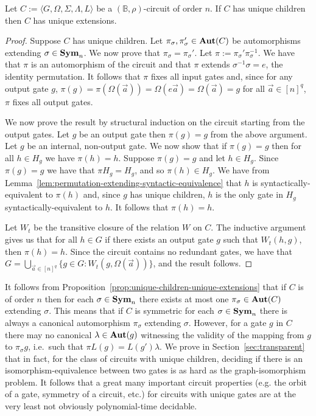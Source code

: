 \documentclass[../paper.tex]{subfiles}
\begin{document}
\begin{prop}
  Let $C := \langle G, \Omega, \Sigma, \Lambda, L\rangle$ be a $(\mathbb{B},
  \rho)$-circuit of order $n$. If $C$ has unique children then $C$ has unique
  extensions.
  \label{prop:unique-children-unique-extensions}
\end{prop}
\begin{proof}
  Suppose $C$ has unique children. Let $\pi_{\sigma}, \pi_{\sigma}' \in \text{\textbf{Aut}}(C)$
  be automorphisms extending $\sigma \in \text{\textbf{Sym}}_n$. We now prove that $\pi_\sigma
  = \pi_{\sigma}'$. Let $\pi := \pi_{\sigma}'\pi^{-1}_\sigma$. We have that
  $\pi$ is an automorphism of the circuit and that $\pi$ extends
  $\sigma^{-1}\sigma = e$, the identity permutation. It follows that $\pi$ fixes
  all input gates and, since for any output gate $g$, $\pi (g) = \pi
  (\Omega(\vec{a})) = \Omega(e \vec{a}) = \Omega(\vec{a}) = g$ for all $\vec{a}
  \in [n]^q$, $\pi$ fixes all output gates.

  We now prove the result by structural induction on the circuit starting from
  the output gates. Let $g$ be an output gate then $\pi (g) = g$ from the above
  argument. Let $g$ be an internal, non-output gate. We now show that if $\pi
  (g) = g$ then for all $h \in H_g$ we have $\pi (h) = h$. Suppose $\pi (g) = g$
  and let $h \in H_g$. Since $\pi (g) = g$ we have that $\pi H_{g} = H_g$, and
  so $\pi (h) \in H_g$. We have from
  Lemma~\ref{lem:permutation-extending-syntactic-equivalence} that $h$ is
  syntactically-equivalent to $\pi (h)$ and, since $g$ has unique children, $h$
  is the only gate in $H_g$ syntactically-equivalent to $h$. It follows that
  $\pi (h) = h$.
  
  Let $W_t$ be the transitive closure of the relation $W$ on $C$. The inductive
  argument gives us that for all $h \in G$ if there exists an output gate $g$
  such that $W_t(h, g)$, then $\pi (h) = h$. Since the circuit contains no
  redundant gates, we have that $G = \bigcup_{\vec{a} \in [n]^q} \{g \in G : W_t
  (g, \Omega(\vec{a}))\}$, and the result follows.
\end{proof}

It follows from Proposition~\ref{prop:unique-children-unique-extensions} that if
$C$ is of order $n$ then for each $\sigma \in \text{\textbf{Sym}}_n$ there exists at most one
$\pi_\sigma \in \text{\textbf{Aut}}(C)$ extending $\sigma$. This means that if $C$ is symmetric
for each $\sigma \in \text{\textbf{Sym}}_n$ there is always a canonical automorphism
$\pi_\sigma$ extending $\sigma$. However, for a gate $g$ in $C$ there may no
canonical $\lambda \in \text{\textbf{Aut}}(g)$ witnessing the validity of the mapping from $g$
to $\pi_\sigma g$, i.e.\ such that $\pi L(g) = L(g') \lambda$. We prove in
Section~\ref{sec:transparent} that in fact, for the class of circuits with
unique children, deciding if there is an isomorphism-equivalence between two
gates is as hard as the graph-isomorphism problem. It follows that a great many
important circuit properties (e.g. the orbit of a gate, symmetry of a circuit,
etc.) for circuits with unique gates are at the very least not obviously
polynomial-time decidable.
\end{document}
